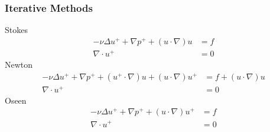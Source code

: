 \subsubsection{Iterative Methods}
Stokes
\[
  \begin{split}
    -\nu \Delta u^++\nabla p^++ (u\cdot\nabla)u &= f\\
    \nabla\cdot u^+&=0
  \end{split}
\]
Newton
\[
  \begin{split}
    -\nu \Delta u^++\nabla p^++ (u^+\cdot\nabla)u+(u\cdot\nabla)u^+&= f+(u\cdot\nabla)u \\
    \nabla\cdot u^+&=0
  \end{split}
\]
Oseen
\[
  \begin{split}
    -\nu \Delta u^++\nabla p^++ (u\cdot\nabla)u^+&= f \\
    \nabla\cdot u^+&=0
  \end{split}
\]
